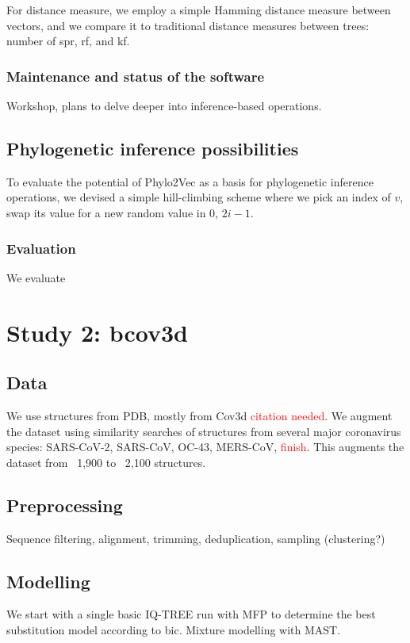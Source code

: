 For distance measure, we employ a simple Hamming distance measure between vectors, and we compare it to traditional distance measures between trees: number of \gls{spr}, \gls{rf}, and \gls{kf}.

\subsubsection{Maintenance and status of the software}
Workshop, plans to delve deeper into inference-based operations.

\subsection{Phylogenetic inference possibilities}
To evaluate the potential of Phylo2Vec as a basis for phylogenetic inference operations, we devised a simple hill-climbing scheme where we pick an index of $v$, swap its value for a new random value in $0$, $2i-1$.

\subsubsection{Evaluation}
We evaluate

\section{Study 2: bcov3d}
\subsection{Data}
We use structures from PDB, mostly from Cov3d \textcolor{red}{citation needed}. We augment the dataset using similarity searches of structures from several major coronavirus species: SARS-CoV-2, SARS-CoV, OC-43, MERS-CoV, \textcolor{red}{finish}. This augments the dataset from ~1,900 to ~2,100 structures.

\subsection{Preprocessing}
Sequence filtering, alignment, trimming, deduplication, sampling (clustering?)

\subsection{Modelling}
We start with a single basic IQ-TREE run with MFP to determine the best substitution model according to \gls{bic}.
Mixture modelling with MAST.

